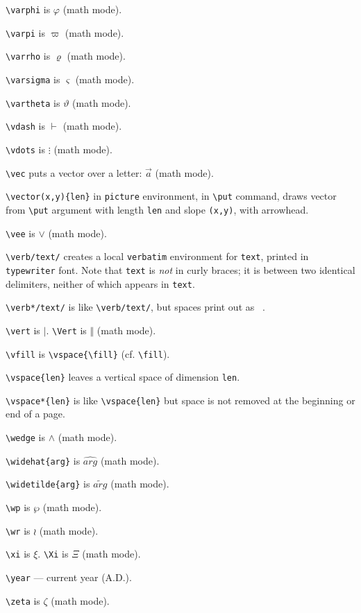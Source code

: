 \verb"\varphi" is $\varphi$ (math mode).

\verb"\varpi" is $\varpi$ (math mode).

\verb"\varrho" is $\varrho$ (math mode).

\verb"\varsigma" is $\varsigma$ (math mode).

\verb"\vartheta" is $\vartheta$ (math mode).

\verb"\vdash" is $\vdash$ (math mode).

\verb"\vdots" is $\vdots$ (math mode).

\verb"\vec" puts a vector over a letter: $\vec a$ (math mode).

\verb"\vector(x,y){len}" in \verb"picture" environment, in \verb"\put"
	command, draws vector from \verb"\put" argument with length \verb"len"
	and slope \verb"(x,y)", with arrowhead.

\verb"\vee" is $\vee$ (math mode).

\verb"\verb/text/" creates a local \verb"verbatim" environment for \verb"text",
	printed in \verb"typewriter" font. Note that \verb"text"
	is {\em not} in curly braces; it is between two identical delimiters,
	neither of which appears in \verb"text".

\verb"\verb*/text/" is like \verb"\verb/text/", but spaces print out
	as \verb*" ".

\verb"\vert" is $\vert$. \verb"\Vert" is $\Vert$ (math mode).

\verb"\vfill" is \verb"\vspace{\fill}" (cf. \verb"\fill").

\verb"\vspace{len}" leaves a vertical space of dimension \verb"len".

\verb"\vspace*{len}" is like \verb"\vspace{len}" but space is not removed at the
	beginning or end of a page.

\verb"\wedge" is $\wedge$ (math mode).

\verb"\widehat{arg}" is $\widehat{arg}$ (math mode).

\verb"\widetilde{arg}" is $\widetilde{arg}$ (math mode).

\verb"\wp" is $\wp$ (math mode).

\verb"\wr" is $\wr$ (math mode).

\verb"\xi" is $\xi$. \verb"\Xi" is $\Xi$ (math mode).

\verb"\year" --- current year (A.D.).

\verb"\zeta" is $\zeta$ (math mode).

\endinput

